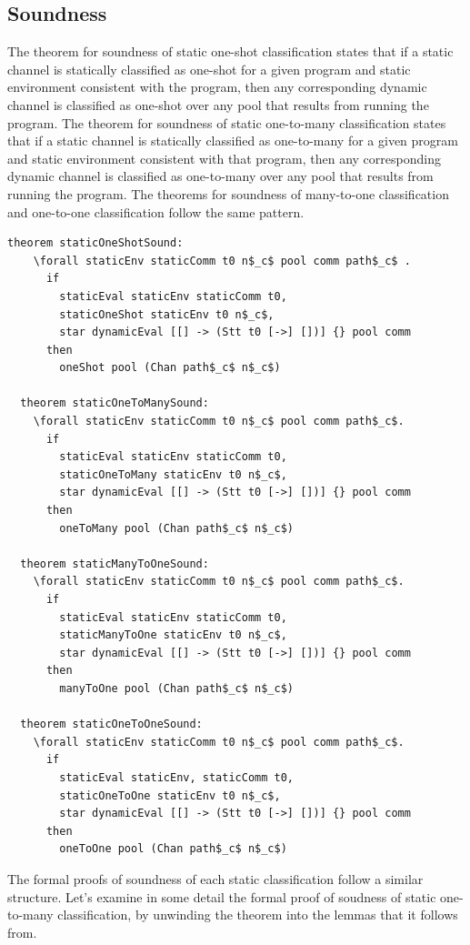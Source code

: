 \documentclass[letterpaper, 11pt]{extarticle}
\begin{document}
\subsection{Soundness}

The theorem for soundness of static one-shot classification states that if a static channel is
statically classified as one-shot for a given program and
static environment consistent with the
program, then any corresponding dynamic channel is classified
as one-shot over any pool that results
from running the program. The theorem for soundness of
static one-to-many classification states that if
a static channel is statically classified as one-to-many for a given program and static environment
consistent with that program, then any corresponding dynamic channel is classified as one-to-many
over any pool that results from running the program.  The theorems for soundness of many-to-one
classification and one-to-one classification follow the same pattern. 

\begin{lstlisting}[language=logic, mathescape]
  theorem staticOneShotSound: 
    \forall staticEnv staticComm t0 n$_c$ pool comm path$_c$ .
      if
        staticEval staticEnv staticComm t0, 
        staticOneShot staticEnv t0 n$_c$, 
        star dynamicEval [[] -> (Stt t0 [->] [])] {} pool comm
      then
        oneShot pool (Chan path$_c$ n$_c$)

  theorem staticOneToManySound:
    \forall staticEnv staticComm t0 n$_c$ pool comm path$_c$. 
      if 
        staticEval staticEnv staticComm t0, 
        staticOneToMany staticEnv t0 n$_c$, 
        star dynamicEval [[] -> (Stt t0 [->] [])] {} pool comm
      then
        oneToMany pool (Chan path$_c$ n$_c$)

  theorem staticManyToOneSound:
    \forall staticEnv staticComm t0 n$_c$ pool comm path$_c$. 
      if
        staticEval staticEnv staticComm t0, 
        staticManyToOne staticEnv t0 n$_c$, 
        star dynamicEval [[] -> (Stt t0 [->] [])] {} pool comm
      then
        manyToOne pool (Chan path$_c$ n$_c$)

  theorem staticOneToOneSound:
    \forall staticEnv staticComm t0 n$_c$ pool comm path$_c$. 
      if
        staticEval staticEnv, staticComm t0, 
        staticOneToOne staticEnv t0 n$_c$,
        star dynamicEval [[] -> (Stt t0 [->] [])] {} pool comm
      then
        oneToOne pool (Chan path$_c$ n$_c$)
\end{lstlisting}

The formal proofs of soundness of each static classification follow a similar structure.
Let's examine in some detail the formal proof of soudness of static one-to-many classification,
by unwinding the theorem into the lemmas that it follows from.
\end{document}
